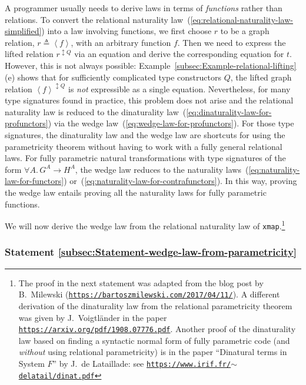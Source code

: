 A programmer usually needs to derive laws in terms of \emph{functions}
rather than relations. To convert the relational naturality law~(\ref{eq:relational-naturality-law-simplified})
into a law involving functions, we first choose $r$ to be a graph
relation, $r\triangleq\left<f\right>$, with an arbitrary function
$f$. Then we need to express the lifted relation $r^{\updownarrow Q}$
via an equation and derive the corresponding equation for $t$. However,
this is not always possible: Example~\ref{subsec:Example-relational-lifting}(e)
shows that for sufficiently complicated type constructors $Q$, the
lifted graph relation $\left<f\right>^{\updownarrow Q}$ is \emph{not}
expressible as a single equation. Nevertheless, for many type signatures
found in practice, this problem does not arise and the relational
naturality law is reduced to the dinaturality law~(\ref{eq:dinaturality-law-for-profunctors})
via the wedge law~(\ref{eq:wedge-law-for-profunctors}). For those
type signatures, the dinaturality law  and the wedge law are shortcuts
for using the parametricity theorem without having to work with a
fully general relational laws. For fully parametric natural transformations
with type signatures of the form $\forall A.\,G^{A}\rightarrow H^{A}$,
the wedge law reduces to the naturality laws~(\ref{eq:naturality-law-for-functors})
or~(\ref{eq:naturality-law-for-contrafunctors}). In this way, proving
the wedge law entails proving all the naturality laws for fully parametric
functions.

We will now derive the wedge law from the relational naturality law
of \lstinline!xmap!.\footnote{The proof in the next statement was adapted from the blog post by
B.~Milewski (\texttt{\href{https://bartoszmilewski.com/2017/04/11/}{https://bartoszmilewski.com/2017/04/11/}}).
A different derivation of the dinaturality law from the relational
parametricity theorem was given by J.~Voigtl\"ander
in the paper \texttt{\href{https://arxiv.org/pdf/1908.07776.pdf}{https://arxiv.org/pdf/1908.07776.pdf}}.
Another proof of the dinaturality law based on finding a syntactic
normal form of fully parametric code (and \emph{without} using relational
 parametricity) is in the paper \textsf{``}Dinatural terms in System $F$\textsf{''}
by J.~de Lataillade: see \texttt{\href{https://www.irif.fr/~delatail/dinat.pdf}{https://www.irif.fr/$\sim$delatail/dinat.pdf}}} 

\subsubsection{Statement \label{subsec:Statement-wedge-law-from-parametricity}\ref{subsec:Statement-wedge-law-from-parametricity}}

